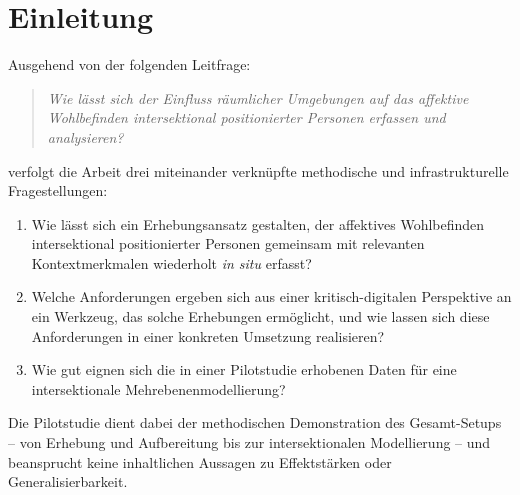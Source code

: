 

\chapter{Einleitung} \label{sec:einleitung}

Ausgehend von der folgenden Leitfrage:

\begin{quote}
\emph{Wie lässt sich der Einfluss räumlicher Umgebungen auf das affektive Wohlbefinden intersektional positionierter Personen erfassen und analysieren?}
\end{quote}

verfolgt die Arbeit drei miteinander verknüpfte methodische und infrastrukturelle Fragestellungen:
\begin{enumerate}
    \item Wie lässt sich ein Erhebungsansatz gestalten, der affektives Wohlbefinden intersektional positionierter Personen gemeinsam mit relevanten Kontextmerkmalen wiederholt \textit{in situ} erfasst?
    \item Welche Anforderungen ergeben sich aus einer kritisch-digitalen Perspektive an ein Werkzeug, das solche Erhebungen ermöglicht, und wie lassen sich diese Anforderungen in einer konkreten Umsetzung realisieren?
    \item Wie gut eignen sich die in einer Pilotstudie erhobenen Daten für eine intersektionale Mehrebenenmodellierung?
\end{enumerate}
Die Pilotstudie dient dabei der methodischen Demonstration des Gesamt-Setups – von Erhebung und Aufbereitung bis zur intersektionalen Modellierung – und beansprucht keine inhaltlichen Aussagen zu Effektstärken oder Generalisierbarkeit.


